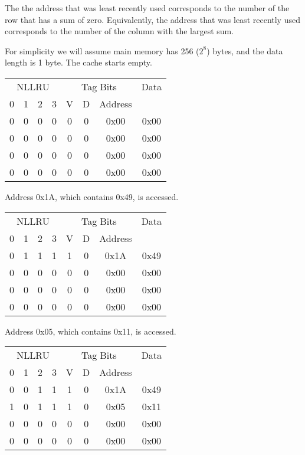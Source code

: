 The the address that was least recently used corresponds to the number of the row that has a sum of zero.  Equivalently, the address that was least recently used corresponds to the number of the column with the largest sum.


For simplicity we will assume main memory has 256 ($2^8$) bytes, and the data length is 1 byte.  The cache starts empty.

\vspace{6pt}\noindent
\begin{tabular}{|c|c|c|c|c|c|c|c|}
  \hline
  \multicolumn{4}{|c|}{NLLRU} & \multicolumn{3}{|c|}{Tag Bits} & Data \\
  0 & 1 & 2 & 3 & V & D & Address & \\ \hline
  0 & 0 & 0 & 0 & 0 & 0 & 0x00 & 0x00 \\
  0 & 0 & 0 & 0 & 0 & 0 & 0x00 & 0x00 \\
  0 & 0 & 0 & 0 & 0 & 0 & 0x00 & 0x00 \\
  0 & 0 & 0 & 0 & 0 & 0 & 0x00 & 0x00 \\
  \hline
\end{tabular}
\vspace{6pt}

Address 0x1A, which contains 0x49, is accessed.

\vspace{6pt}\noindent
\begin{tabular}{|c|c|c|c|c|c|c|c|}
  \hline
  \multicolumn{4}{|c|}{NLLRU} & \multicolumn{3}{|c|}{Tag Bits} & Data \\
  0 & 1 & 2 & 3 & V & D & Address & \\ \hline
  0 & 1 & 1 & 1 & 1 & 0 & 0x1A & 0x49 \\
  0 & 0 & 0 & 0 & 0 & 0 & 0x00 & 0x00 \\
  0 & 0 & 0 & 0 & 0 & 0 & 0x00 & 0x00 \\
  0 & 0 & 0 & 0 & 0 & 0 & 0x00 & 0x00 \\
  \hline
\end{tabular}
\vspace{6pt}

Address 0x05, which contains 0x11, is accessed.

\vspace{6pt}\noindent
\begin{tabular}{|c|c|c|c|c|c|c|c|}
  \hline
  \multicolumn{4}{|c|}{NLLRU} & \multicolumn{3}{|c|}{Tag Bits} & Data \\
  0 & 1 & 2 & 3 & V & D & Address & \\ \hline
  0 & 0 & 1 & 1 & 1 & 0 & 0x1A & 0x49 \\
  1 & 0 & 1 & 1 & 1 & 0 & 0x05 & 0x11 \\
  0 & 0 & 0 & 0 & 0 & 0 & 0x00 & 0x00 \\
  0 & 0 & 0 & 0 & 0 & 0 & 0x00 & 0x00 \\
  \hline
\end{tabular}
\vspace{6pt}

